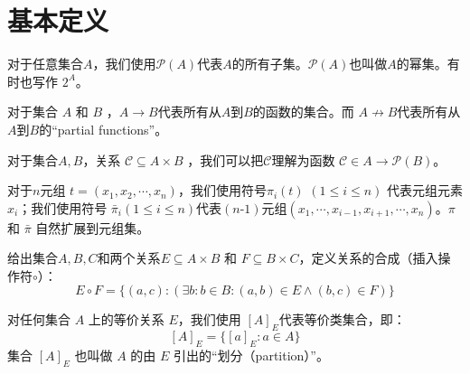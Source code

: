 \chapter{基本定义}

\begin{convention}[幂集] 
    对于任意集合$A$，我们使用$\mathcal{P}(A)$代表$A$的所有子集。$\mathcal{P}(A)$也叫做$A$的幂集。有时也写作 $2^A$。
\end{convention}

\begin{convention}[函数集] \label{pro:mathP}
    对于集合 $A$ 和 $B$ ，$A\to B$代表所有从$A$到$B$的函数的集合。而 $ A \not\to B$代表所有从$A$到$B$的“partial functions”。
\end{convention}


\begin{remark}
    对于集合$A,B$，关系 $\mathcal{C}\subseteq A \times B$ ，我们可以把$\mathcal{C}$理解为函数 $\mathcal{C} \in A \longrightarrow \mathcal{P}(B)$。
\end{remark}



\begin{convention}[元组投影]
    对于$n$元组 $t=(x_1,x_2,\cdots,x_n)$，我们使用符号${\pi}_i(t)$ $(1 \leq i \leq n)$ 代表元组元素$x_i$；我们使用符号 $\bar{\pi}_i(1 \leq i \leq n)$代表$(n\mbox{-}1)$元组$(x_1,\cdots,x_{i-1},x_{i+1},\cdots,x_n)$。$\pi$ 和 $\bar{\pi}$ 自然扩展到元组集。 
\end{convention}



\begin{convention}[关系的合成]
    给出集合$A,B,C$和两个关系$E \subseteq A \times B$ 和 $ F \subseteq B \times C $，定义关系的合成（插入操作符$\circ$）：
$$ E\circ F = \{ (a,c) : (\exists b:b \in B : (a,b) \in E \land (b,c) \in F) \} $$ 
\end{convention}



\begin{convention}[等价关系的等价类]
    对任何集合 $A$ 上的等价关系 $E$，我们使用 $[A]_E$代表等价类集合，即：
$$ [A]_E = \{ [a]_E :a \in A \} $$
集合 $[A]_E$ 也叫做 $A$ 的由 $E$ 引出的“划分（partition）”。
\end{convention}


